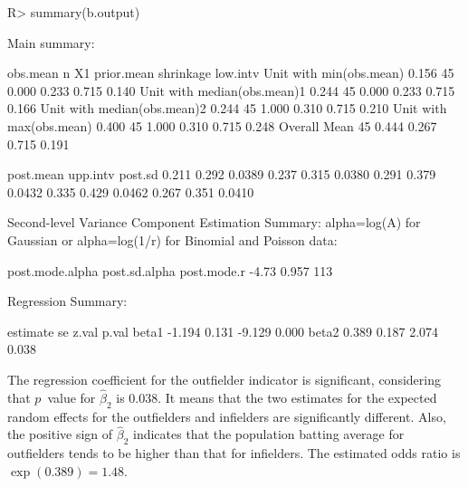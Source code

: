 \documentclass[article]{jss}
\begin{document}
\begin{CodeChunk}
\begin{CodeInput}
R> summary(b.output)
\end{CodeInput}
\begin{CodeOutput}
Main summary:

                            obs.mean  n    X1 prior.mean shrinkage low.intv 
Unit with min(obs.mean)        0.156 45 0.000      0.233     0.715    0.140     
Unit with median(obs.mean)1    0.244 45 0.000      0.233     0.715    0.166     
Unit with median(obs.mean)2    0.244 45 1.000      0.310     0.715    0.210     
Unit with max(obs.mean)        0.400 45 1.000      0.310     0.715    0.248     
Overall Mean                         45 0.444      0.267     0.715    0.191     


                            post.mean upp.intv post.sd
                                0.211    0.292  0.0389
                                0.237    0.315  0.0380
                                0.291    0.379  0.0432
                                0.335    0.429  0.0462
                                0.267    0.351  0.0410

Second-level Variance Component Estimation Summary:
alpha=log(A) for Gaussian or alpha=log(1/r) for Binomial and Poisson data:

post.mode.alpha post.sd.alpha post.mode.r
          -4.73         0.957         113


Regression Summary:

      estimate    se  z.val p.val
beta1   -1.194 0.131 -9.129 0.000
beta2    0.389 0.187  2.074 0.038
\end{CodeOutput}
\end{CodeChunk}

The regression coefficient for the outfielder indicator is significant, considering that $p$~value for $\hat{\beta}_2$ is 0.038. It means that the  two estimates for the expected random effects for the outfielders and infielders are significantly different. Also, the positive sign of $\hat{\beta}_{2}$ indicates that the population batting average for  outfielders tends to be higher than that for infielders. The  estimated odds ratio is $\exp(0.389)=1.48$.
\end{document}
